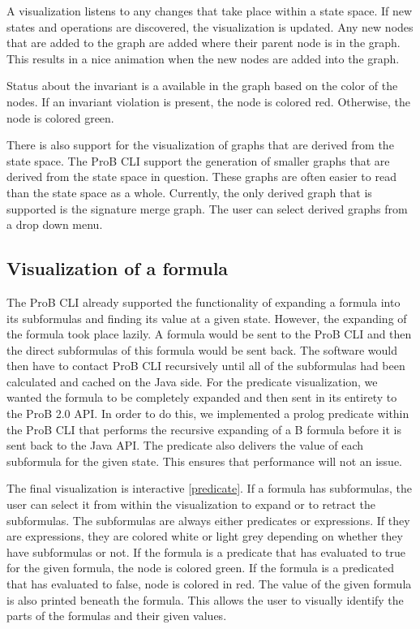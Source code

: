 A visualization listens to any changes that take place within a state space. If new states and operations are discovered, the visualization is updated. Any new nodes that are added to the graph are added where their parent node is in the graph. This results in a nice animation when the new nodes are added into the graph.

Status about the invariant is a available in the graph based on the color of the nodes. If an invariant violation is present, the node is colored red. Otherwise, the node is colored green.

There is also support for the visualization of graphs that are derived from the state space. The ProB CLI support the generation of smaller graphs that are derived from the state space in question. These graphs are often easier to read than the state space as a whole. Currently, the only derived graph that is supported is the signature merge graph. The user can select derived graphs from a drop down menu.

\subsection{Visualization of a formula}

The ProB CLI already supported the functionality of expanding a formula into its subformulas and finding its value at a given state. However, the expanding of the formula took place lazily. A formula would be sent to the ProB CLI and then the direct subformulas of this formula would be sent back. The software would then have to contact ProB CLI recursively until all of the subformulas had been calculated and cached on the Java side. For the predicate visualization, we wanted the formula to be completely expanded and then sent in its entirety to the ProB 2.0 API. In order to do this, we implemented a prolog predicate within the ProB CLI that performs the recursive expanding of a B formula before it is sent back to the Java API. The predicate also delivers the value of each subformula for the given state. This ensures that performance will not an issue. 

The final visualization is interactive \ref{predicate}. If a formula has subformulas, the user can select it from within the visualization to expand or to retract the subformulas. The subformulas are always either predicates or expressions. If they are expressions, they are colored white or light grey depending on whether they have subformulas or not. If the formula is a predicate that has evaluated to true for the given formula, the node is colored green. If the formula is a predicated that has evaluated to false, node is colored in red. The value of the given formula is also printed beneath the formula. This allows the user to visually identify the parts of the formulas and their given values. 

